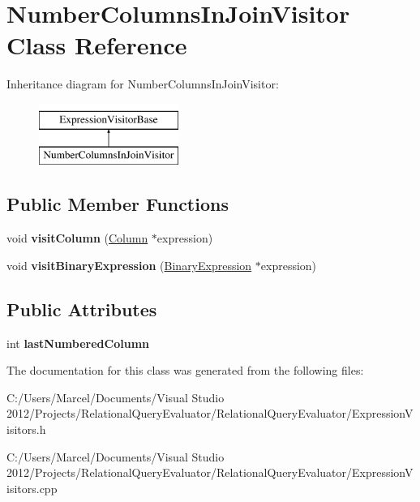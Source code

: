 \hypertarget{class_number_columns_in_join_visitor}{\section{Number\+Columns\+In\+Join\+Visitor Class Reference}
\label{class_number_columns_in_join_visitor}
}
Inheritance diagram for Number\+Columns\+In\+Join\+Visitor\+:\begin{figure}[H]
\begin{center}
\leavevmode
\includegraphics[height=2.000000cm]{class_number_columns_in_join_visitor}
\end{center}
\end{figure}
\subsection*{Public Member Functions}
\begin{DoxyCompactItemize}
\item 
\hypertarget{class_number_columns_in_join_visitor_ac3b174509ec5ec5310ef73e47aa59694}{void {\bfseries visit\+Column} (\hyperlink{class_column}{Column} $\ast$expression)}\label{class_number_columns_in_join_visitor_ac3b174509ec5ec5310ef73e47aa59694}

\item 
\hypertarget{class_number_columns_in_join_visitor_a857c2d096fe87b1ac98ea50922d1c958}{void {\bfseries visit\+Binary\+Expression} (\hyperlink{class_binary_expression}{Binary\+Expression} $\ast$expression)}\label{class_number_columns_in_join_visitor_a857c2d096fe87b1ac98ea50922d1c958}

\end{DoxyCompactItemize}
\subsection*{Public Attributes}
\begin{DoxyCompactItemize}
\item 
\hypertarget{class_number_columns_in_join_visitor_af26374a4ce48016848edd71c935f92a3}{int {\bfseries last\+Numbered\+Column}}\label{class_number_columns_in_join_visitor_af26374a4ce48016848edd71c935f92a3}

\end{DoxyCompactItemize}


The documentation for this class was generated from the following files\+:\begin{DoxyCompactItemize}
\item 
C\+:/\+Users/\+Marcel/\+Documents/\+Visual Studio 2012/\+Projects/\+Relational\+Query\+Evaluator/\+Relational\+Query\+Evaluator/Expression\+Visitors.\+h\item 
C\+:/\+Users/\+Marcel/\+Documents/\+Visual Studio 2012/\+Projects/\+Relational\+Query\+Evaluator/\+Relational\+Query\+Evaluator/Expression\+Visitors.\+cpp\end{DoxyCompactItemize}
